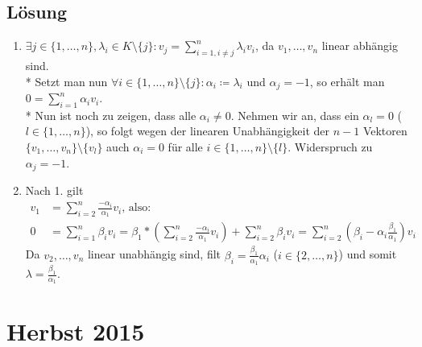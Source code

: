 \subsection{Lösung}
\begin{enumerate}
	\item \( \exists j \in \{1,\dots,n\}, \lambda_i \in K\setminus\{j\} : v_j = \sum_{i=1, i\neq j}^n\lambda_iv_i \), da \( v_1, \dots, v_n \) linear abhängig sind. \\*
		Setzt man nun \( \forall i \in \{1, \dots, n\} \setminus \{j\}: \alpha_i \coloneqq \lambda_i \) und \( \alpha_j = -1 \), so erhält man \( 0 = \sum_{i=1}^n\alpha_iv_i \). \\*
		Nun ist noch zu zeigen, dass alle \( \alpha_i \neq 0 \). Nehmen wir an, dass ein \( \alpha_l = 0 \) (\( l \in \{1, \dots, n\} \)), so folgt wegen der linearen Unabhängigkeit der \( n-1 \) Vektoren \( \{ v_1, \dots, v_n \} \setminus \{ v_l \} \) auch \( \alpha_i = 0 \) für alle \( i \in \{1, \dots, n\} \setminus \{ l \} \). Widerspruch zu \( \alpha_j = -1 \).

	\item Nach 1. gilt 
	\begin{align*}
		v_1 &= \sum_{i=2}^n \frac{-\alpha_i}{\alpha_1}v_i\text{, also: } \\
		0 &= \sum_{i=1}^n\beta_iv_i = \beta_1 * \left(\sum_{i=2}^n \frac{-\alpha_i}{\alpha_1}v_i\right) + \sum_{i=2}^n\beta_iv_i = \sum_{i=2}^n \left(\beta_i - \alpha_i \frac{\beta_1}{\alpha_1}\right)v_i
	\end{align*}
	Da \( v_2, \dots, v_n \) linear unabhängig sind, filt \( \beta_i = \tfrac{\beta_1}{\alpha_1}\alpha_i \) (\( i \in \{ 2, \dots, n \} \)) und somit \( \lambda = \tfrac{\beta_1}{\alpha_1} \).
\end{enumerate}

\newpage

\section{Herbst 2015}

